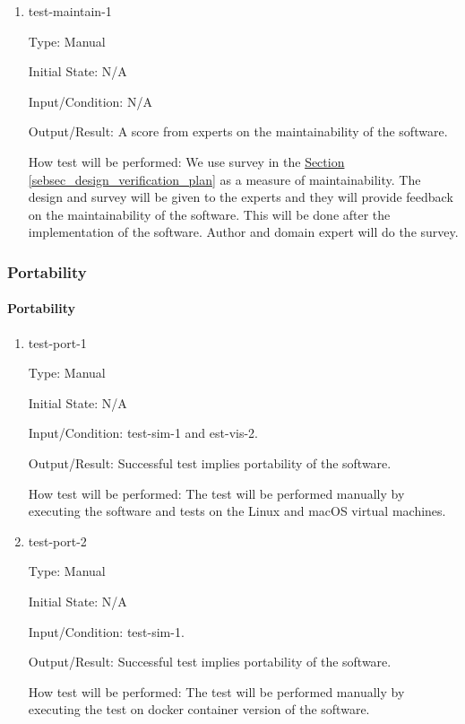 \documentclass[12pt, titlepage]{article}
\begin{document}
\begin{enumerate}

\item{test-maintain-1\\}

Type: Manual
					
Initial State: N/A
					
Input/Condition: N/A
					
Output/Result: A score from experts on the maintainability of the software.
					
How test will be performed: We use survey in the 
\hyperref[sebsec_design_verification_plan]{Section \ref*{sebsec_design_verification_plan}} as 
a measure of maintainability. The design and survey will be given to the experts and 
they will provide feedback on the maintainability of the software.
This will be done after the implementation of the software.
Author and domain expert will do the survey.

\end{enumerate}

\subsubsection{Portability}

\paragraph{Portability}

\begin{enumerate}

\item{test-port-1\\}

Type: Manual
					
Initial State: N/A
					
Input/Condition: test-sim-1 and est-vis-2. 
					
Output/Result: Successful test implies portability of the software.
					
How test will be performed: The test will be performed manually 
by executing the software and tests on the Linux and macOS virtual machines.

\item{test-port-2\\}

Type: Manual
					
Initial State: N/A
					
Input/Condition: test-sim-1.
					
Output/Result: Successful test implies portability of the software.
					
How test will be performed: The test will be performed manually 
by executing the test on docker container version of the software.

\end{enumerate}
\end{document}

